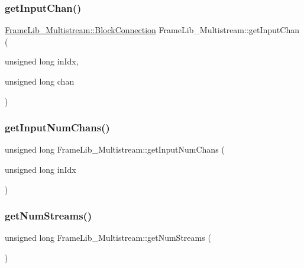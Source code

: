 \subsubsection{\texorpdfstring{get\+Input\+Chan()}{getInputChan()}}
{\footnotesize\ttfamily \hyperlink{class_frame_lib___multistream_a611f70443aaa3eb2205f578c0882c469}{Frame\+Lib\+\_\+\+Multistream\+::\+Block\+Connection} Frame\+Lib\+\_\+\+Multistream\+::get\+Input\+Chan (\begin{DoxyParamCaption}\item[{unsigned long}]{in\+Idx,  }\item[{unsigned long}]{chan }\end{DoxyParamCaption})\hspace{0.3cm}{\ttfamily [protected]}}

\mbox{\label{class_frame_lib___multistream_a50c911473af911e3d68cc7d5c80d0eb1}} 
\subsubsection{\texorpdfstring{get\+Input\+Num\+Chans()}{getInputNumChans()}}
{\footnotesize\ttfamily unsigned long Frame\+Lib\+\_\+\+Multistream\+::get\+Input\+Num\+Chans (\begin{DoxyParamCaption}\item[{unsigned long}]{in\+Idx }\end{DoxyParamCaption})\hspace{0.3cm}{\ttfamily [protected]}}

\mbox{\label{class_frame_lib___multistream_adca964e3fa45b2f0c9eb9f902361df13}} 
\subsubsection{\texorpdfstring{get\+Num\+Streams()}{getNumStreams()}}
{\footnotesize\ttfamily unsigned long Frame\+Lib\+\_\+\+Multistream\+::get\+Num\+Streams (\begin{DoxyParamCaption}{ }\end{DoxyParamCaption})\hspace{0.3cm}{\ttfamily [inline]}}

